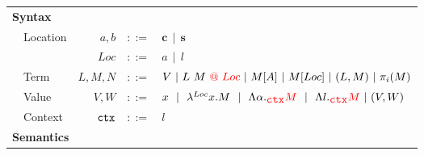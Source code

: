 \documentclass[a4paper]{article}
\makeatletter
\theoremstyle{plain}
\theoremstyle{definition}
\newcommand{\ruleverticalsep}{0.5cm}
\newcommand{\client}{\textbf{c}}
\newcommand{\server}{\textbf{s}}
\newcommand{\Loc}{Loc}
\newcommand{\at}[1]{@#1}
\newcommand{\eff}{\mbox{\texttt{ctx}}}
\makeatother
\begin{document}
\begin{figure}[h]
\centering  
\begin{tabular}{ l  l  r  c  l }
\multicolumn{5}{l}{\textbf{Syntax}} \\
 & Location & $a,b$   & $::=$ & $\client \ \ | \  \  \server$ \\
 &          & $\Loc$  & $::=$  & $a  \ \ |  \ \ l$ \\
 & Term     & $L,M,N$ & $::=$  & $V  \ | \  L \ M \ {\color{red}\at{\ \Loc}} \ | \  M[A]  \ | \  M[\Loc]  \ | \  (L,M)  \ |  \ \pi_i(M)$ \\
 & Value & $V,W$ & $::=$ & $x  \ \ |  \ \ \lambda^{Loc} x.M  \ \ |  \ \ \Lambda\alpha._{\color{red} \eff} {\color{red} M}  \ \ |  \ \ \Lambda l._{\color{red} \eff} {\color{red} M} \ | \ (V,W)$ \\
 & Context  & $\eff$  & $::=$ & $l$ \\[\ruleverticalsep]
\multicolumn{5}{l}{\textbf{Semantics}} \\
\end{tabular}


\end{figure}
\end{document}
